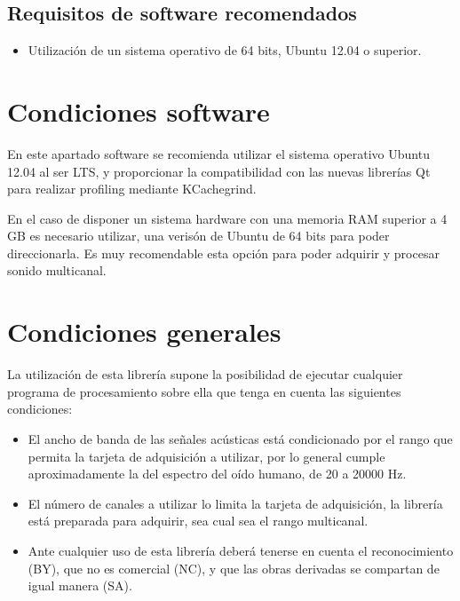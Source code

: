 \subsection{Requisitos de software recomendados}
\begin{itemize}
  \item Utilización de un sistema operativo de 64 bits, Ubuntu 12.04 o superior.
\end{itemize}

\section{Condiciones software}

En este apartado software se recomienda utilizar el sistema operativo Ubuntu 12.04 al ser LTS, y proporcionar la compatibilidad con las nuevas librerías Qt para realizar profiling mediante KCachegrind.

En el caso de disponer un sistema hardware con una memoria RAM superior a 4 GB es necesario utilizar, una verisón de Ubuntu de 64 bits para poder direccionarla. Es muy recomendable esta opción para poder adquirir y procesar sonido multicanal.

\newpage
\section{Condiciones generales}

La utilización de esta librería supone la posibilidad de ejecutar cualquier programa de procesamiento sobre ella que tenga en cuenta las siguientes condiciones:

\begin{itemize}
  \item El ancho de banda de las señales acústicas está condicionado por el rango que permita la tarjeta de adquisición a utilizar, por lo general cumple aproximadamente la del espectro del oído humano, de 20 a 20000 Hz.
  \item El número de canales a utilizar lo limita la tarjeta de adquisición, la librería está preparada para adquirir, sea cual sea el rango multicanal.
  \item Ante cualquier uso de esta librería deberá tenerse en cuenta el reconocimiento (BY), que no es comercial (NC), y que las obras derivadas se compartan de igual manera (SA).

\end{itemize}

